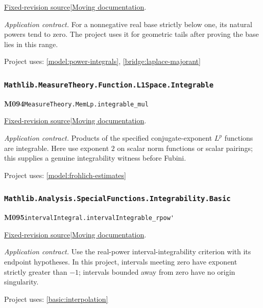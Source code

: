 \documentclass[11pt,a4paper]{article}
\theoremstyle{definition}
\theoremstyle{remark}
\begin{document}
\href{https://github.com/leanprover-community/mathlib4/blob/9bac2d0692944a775113f7c130fd5e5b4608a854/Mathlib/Analysis/SpecificLimits/Basic.lean}{Fixed-revision source}\quad|\quad\href{https://leanprover-community.github.io/mathlib4_docs/Mathlib/Analysis/SpecificLimits/Basic.html#tendsto_pow_atTop_nhds_zero_of_lt_one}{Moving documentation}.\par
\noindent\textit{Application contract.} For a nonnegative real base strictly below one, its natural powers tend to zero. The project uses it for geometric tails after proving the base lies in this range.\par
{\small Project uses: \ref{model:power-integrals}, \ref{bridge:laplace-majorant}}\par\medskip

\subsubsection*{\nolinkurl{Mathlib.MeasureTheory.Function.L1Space.Integrable}}
\noindent\textbf{M094}\label{base:M094}\quad\nolinkurl{MeasureTheory.MemLp.integrable_mul}

\href{https://github.com/leanprover-community/mathlib4/blob/9bac2d0692944a775113f7c130fd5e5b4608a854/Mathlib/MeasureTheory/Function/L1Space/Integrable.lean}{Fixed-revision source}\quad|\quad\href{https://leanprover-community.github.io/mathlib4_docs/Mathlib/MeasureTheory/Function/L1Space/Integrable.html#MeasureTheory.MemLp.integrable_mul}{Moving documentation}.\par
\noindent\textit{Application contract.} Products of the specified conjugate-exponent $L^p$ functions are integrable. Here use exponent $2$ on scalar norm functions or scalar pairings; this supplies a genuine integrability witness before Fubini.\par
{\small Project uses: \ref{model:frohlich-estimates}}\par\medskip

\subsubsection*{\nolinkurl{Mathlib.Analysis.SpecialFunctions.Integrability.Basic}}
\noindent\textbf{M095}\label{base:M095}\quad\nolinkurl{intervalIntegral.intervalIntegrable_rpow'}

\href{https://github.com/leanprover-community/mathlib4/blob/9bac2d0692944a775113f7c130fd5e5b4608a854/Mathlib/Analysis/SpecialFunctions/Integrability/Basic.lean}{Fixed-revision source}\quad|\quad\href{https://leanprover-community.github.io/mathlib4_docs/Mathlib/Analysis/SpecialFunctions/Integrability/Basic.html#intervalIntegral.intervalIntegrable_rpow'}{Moving documentation}.\par
\noindent\textit{Application contract.} Use the real-power interval-integrability criterion with its endpoint hypotheses. In this project, intervals meeting zero have exponent strictly greater than $-1$; intervals bounded away from zero have no origin singularity.\par
{\small Project uses: \ref{basic:interpolation}}\par\medskip
\end{document}

